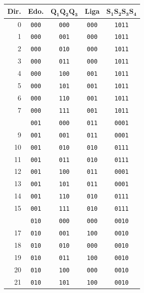 \begin{minipage}[t]{0.48\textwidth}\centering
\begin{tabular}{@{}r c c c c@{}}
\toprule
\textbf{Dir.} & \textbf{Edo.} & $\mathbf{Q_1Q_2Q_3}$ & \textbf{Liga} & $\mathbf{S_1S_2S_3S_4}$ \\
\midrule
0 & \texttt{000} & \texttt{000} & \texttt{000} & \texttt{1011} \\
1 & \texttt{000} & \texttt{001} & \texttt{000} & \texttt{1011} \\
2 & \texttt{000} & \texttt{010} & \texttt{000} & \texttt{1011} \\
3 & \texttt{000} & \texttt{011} & \texttt{000} & \texttt{1011} \\
4 & \texttt{000} & \texttt{100} & \texttt{001} & \texttt{1011} \\
5 & \texttt{000} & \texttt{101} & \texttt{001} & \texttt{1011} \\
6 & \texttt{000} & \texttt{110} & \texttt{001} & \texttt{1011} \\
7 & \texttt{000} & \texttt{111} & \texttt{001} & \texttt{1011} \\
\addlinespace[2pt]
8 & \texttt{001} & \texttt{000} & \texttt{011} & \texttt{0001} \\
9 & \texttt{001} & \texttt{001} & \texttt{011} & \texttt{0001} \\
10 & \texttt{001} & \texttt{010} & \texttt{010} & \texttt{0111} \\
11 & \texttt{001} & \texttt{011} & \texttt{010} & \texttt{0111} \\
12 & \texttt{001} & \texttt{100} & \texttt{011} & \texttt{0001} \\
13 & \texttt{001} & \texttt{101} & \texttt{011} & \texttt{0001} \\
14 & \texttt{001} & \texttt{110} & \texttt{010} & \texttt{0111} \\
15 & \texttt{001} & \texttt{111} & \texttt{010} & \texttt{0111} \\
\addlinespace[2pt]
16 & \texttt{010} & \texttt{000} & \texttt{000} & \texttt{0010} \\
17 & \texttt{010} & \texttt{001} & \texttt{100} & \texttt{0010} \\
18 & \texttt{010} & \texttt{010} & \texttt{000} & \texttt{0010} \\
19 & \texttt{010} & \texttt{011} & \texttt{100} & \texttt{0010} \\
20 & \texttt{010} & \texttt{100} & \texttt{000} & \texttt{0010} \\
21 & \texttt{010} & \texttt{101} & \texttt{100} & \texttt{0010} \\

\end{tabular}
\end{minipage}
